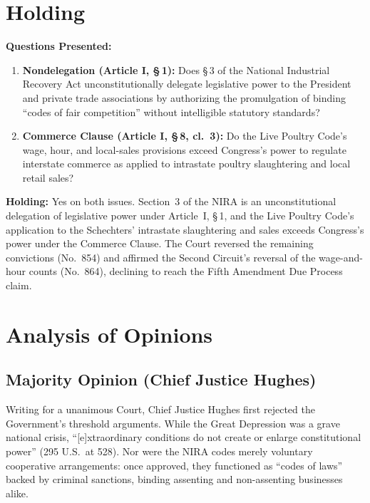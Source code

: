 \documentclass[12pt]{article}
\begin{document}
\section{Holding}
\textbf{Questions Presented:}

\begin{enumerate}
  \item \textbf{Nondelegation (Article I, \S\,1):} Does \S\,3 of the National Industrial Recovery Act unconstitutionally delegate legislative power to the President and private trade associations by authorizing the promulgation of binding ``codes of fair competition'' without intelligible statutory standards?
  \item \textbf{Commerce Clause (Article I, \S\,8, cl.\ 3):} Do the Live Poultry Code's wage, hour, and local-sales provisions exceed Congress's power to regulate interstate commerce as applied to intrastate poultry slaughtering and local retail sales?
\end{enumerate}

\textbf{Holding:} Yes on both issues. Section~3 of the NIRA is an unconstitutional delegation of legislative power under Article~I, \S\,1, and the Live Poultry Code's application to the Schechters' intrastate slaughtering and sales exceeds Congress's power under the Commerce Clause. The Court reversed the remaining convictions (No.\ 854) and affirmed the Second Circuit's reversal of the wage-and-hour counts (No.\ 864), declining to reach the Fifth Amendment Due Process claim.

\section{Analysis of Opinions}
\subsection{Majority Opinion (Chief Justice Hughes)}

Writing for a unanimous Court, Chief Justice Hughes first rejected the Government's threshold arguments. While the Great Depression was a grave national crisis, ``[e]xtraordinary conditions do not create or enlarge constitutional power'' (295 U.S.\ at 528). Nor were the NIRA codes merely voluntary cooperative arrangements: once approved, they functioned as ``codes of laws'' backed by criminal sanctions, binding assenting and non-assenting businesses alike.
\end{document}
